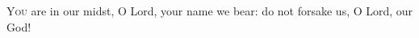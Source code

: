 \lettrine[loversize=0.15,lines=2]{Y}{ou} are in our midst, O Lord,
   your name we bear:
   do not forsake us, O Lord, our God!
